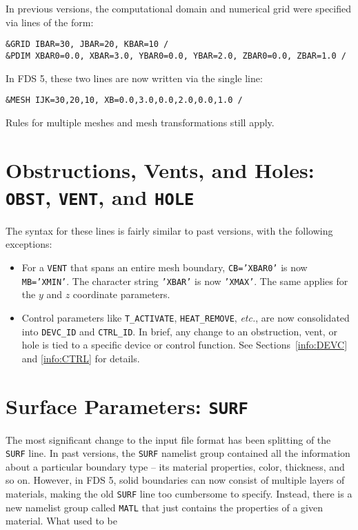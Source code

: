 \documentclass[11pt]{book}
\newcommand{\ct}{\tt\small}
\begin{document}
In previous versions, the computational domain and numerical grid were specified via lines of the form:

\footnotesize
\begin{verbatim}
&GRID IBAR=30, JBAR=20, KBAR=10 /
&PDIM XBAR0=0.0, XBAR=3.0, YBAR0=0.0, YBAR=2.0, ZBAR0=0.0, ZBAR=1.0 /
\end{verbatim} \normalsize

\noindent
In FDS 5, these two lines are now written via the single line:

\footnotesize
\begin{verbatim}
&MESH IJK=30,20,10, XB=0.0,3.0,0.0,2.0,0.0,1.0 /
\end{verbatim} \normalsize

\noindent
Rules for multiple meshes and mesh transformations still apply.

\section{Obstructions, Vents, and Holes: \texorpdfstring{{\tt OBST}}{OBST}, \texorpdfstring{{\tt VENT}}{VENT}, and \texorpdfstring{{\tt HOLE}}{HOLE}}

The syntax for these lines is fairly similar to past versions, with the following exceptions:
\begin{itemize}
\item For a {\ct VENT} that spans an entire mesh boundary, {\ct CB='XBAR0'} is now {\ct MB='XMIN'}. The character string
{\ct 'XBAR'} is now {\ct 'XMAX'}. The same applies for the $y$ and $z$ coordinate parameters.
\item Control parameters like {\ct T\_ACTIVATE}, {\ct HEAT\_REMOVE}, {\em etc.}, are now consolidated into {\ct DEVC\_ID} and
{\ct CTRL\_ID}. In brief,
any change to an obstruction, vent, or hole is tied to a specific device or control function. See Sections~\ref{info:DEVC} and
\ref{info:CTRL} for details.
\end{itemize}


\section{Surface Parameters: \texorpdfstring{{\tt SURF}}{SURF}}

The most significant change to the input file format has been splitting of the {\ct SURF} line. In past versions, the {\ct SURF}
namelist group contained all the information about a particular boundary type -- its material properties, color, thickness, and so on.
However, in FDS 5, solid boundaries can now consist of multiple layers of materials, making the old {\ct SURF} line too cumbersome to
specify. Instead, there is a new namelist group called {\ct MATL} that just contains the properties of a given material. What used to
be
\end{document}

